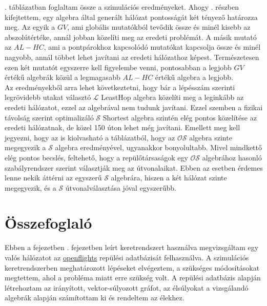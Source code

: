     . táblázatban foglaltam össze a szimulációs eredményeket. Ahogy . részben kifejtettem, egy algebra által generált hálózat pontosságát két tényező határozza meg. Az egyik a $GV$, ami globális mutatókból tevődik össze és minél kisebb az abszolútértéke, annál jobban közelíti meg az eredeti problémát. A másik mutató az $AL-HC$, ami a pontpárokhoz kapcsolódó mutatókat kapcsolja össze és minél nagyobb, annál többet lehet javítani az eredeti hálózathoz képest. Természetesen ezen két mutatót egyszerre kell figyelembe venni, pontosabban a legjobb $GV$ értékű algebrák közül a legmagasabb $AL-HC$ értékű algebra a legjobb.\\

    Az eredményekből arra lehet következtetni, hogy bár a lépésszám szerinti legrövidebb utakat választó $\mathcal{L}$ LeastHop algebra közelíti meg a leginkább az eredeti hálózatot, ezzel az algebrával nem tudunk javítani. Ezzel szemben a fizikai távolság szerint optimalizáló $\mathcal{S}$ Shortest algebra szintén elég pontos közelítése az eredeti hálózatnak, de közel 150 úton lehet még javítani. Emellett meg kell jegyezni, hogy az is kiolvasható a táblázatból, hogy az $\mathcal{OS}$ algebra szinte megegyezik a $\mathcal{S}$ algebra eredményével, ugyanakkor bonyolultabb. Mivel mindkettő elég pontos becslés, feltehető, hogy a repülőtársaságok egy $\mathcal{OS}$ algebrához hasonló szabályrendszer szerint választják meg az útvonalaikat. Ebben az esetben érdemes lenne nekik áttérni az egyszerű $\mathcal{S}$ algebrára, hiszen a két hálózat szinte megegyezik, és a $\mathcal{S}$ útvonalválasztása jóval egyszerűbb.

  \section{Összefoglaló}
  Ebben a fejezetben . fejezetben leírt keretrendszert használva megvizsgáltam egy valós hálózatot az \href{http://openflights.org/}{openflights} repülési adatbázisát felhasználva. A szimulációs keretrendszerben meghatározott lépéseket elvégeztem, a szükséges módosításokat megtettem, ahol a probléma miatt erre szükség volt. A repülési adatbázis alapján létrehoztam az irányított, vektor-súlyozott gráfot, az élsúlyokat a vizsgálandó algebrák alapján számítottam ki és rendeltem az élekhez.\\


